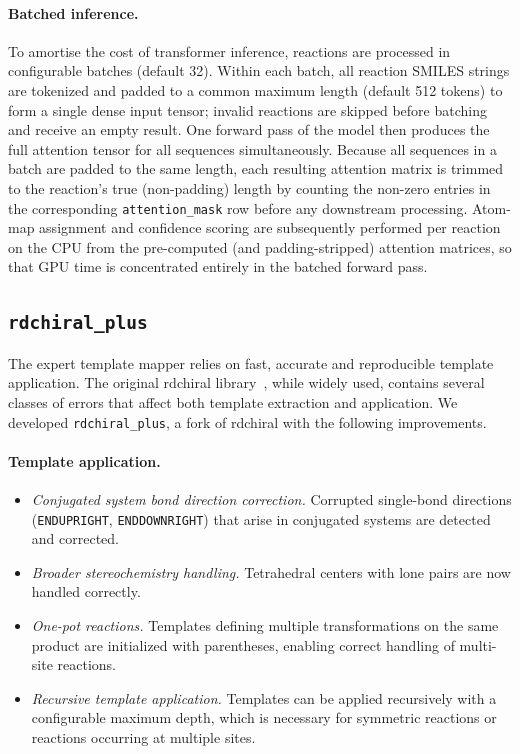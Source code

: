 \documentclass[12pt]{article}
\begin{document}
\paragraph{Batched inference.}
To amortise the cost of transformer inference, reactions are processed in
configurable batches (default 32).  Within each batch, all reaction SMILES
strings are tokenized and padded to a common maximum length (default 512
tokens) to form a single dense input tensor; invalid reactions are skipped
before batching and receive an empty result.  One forward pass of the model
then produces the full attention tensor for all sequences simultaneously.
Because all sequences in a batch are padded to the same length, each
resulting attention matrix is trimmed to the reaction's true (non-padding)
length by counting the non-zero entries in the corresponding
\texttt{attention\_mask} row before any downstream processing.  Atom-map
assignment and confidence scoring are subsequently performed per reaction
on the CPU from the pre-computed (and padding-stripped) attention matrices,
so that GPU time is concentrated entirely in the batched forward pass.

\subsection{\texttt{rdchiral\_plus}}
\label{subsec:rdchiral}

The expert template mapper relies on fast, accurate and reproducible template
application.  The original rdchiral library~\cite{Coley2019rdchiral},
while widely used, contains several classes of errors that affect both
template extraction and application.  We developed
\texttt{rdchiral\_plus}, a fork of rdchiral with the following
improvements.

\paragraph{Template application.}
\begin{itemize}[leftmargin=*]
  \item \emph{Conjugated system bond direction correction.}  Corrupted
        single-bond directions (\texttt{ENDUPRIGHT}, \texttt{ENDDOWNRIGHT})
        that arise in conjugated systems are detected and corrected.
  \item \emph{Broader stereochemistry handling.}  Tetrahedral centers
        with lone pairs are now handled correctly.
  \item \emph{One-pot reactions.}  Templates defining multiple
        transformations on the same product are initialized with
        parentheses, enabling correct handling of multi-site reactions.
  \item \emph{Recursive template application.}  Templates can be
        applied recursively with a configurable maximum depth, which is
        necessary for symmetric reactions or reactions occurring at
        multiple sites.
\end{itemize}
\end{document}
